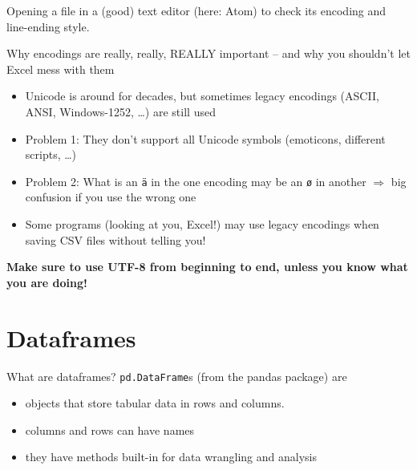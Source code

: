 \documentclass[compress]{beamer}
\begin{document}
\begin{frame}[plain]

Opening a file in a (good) text editor (here: Atom) to check its encoding and line-ending style.
\end{frame}


\begin{frame}{Why encodings are really, really, REALLY important -- and why you shouldn't let Excel mess with them}
\begin{itemize}
	\item Unicode is around for decades, but sometimes legacy encodings (ASCII, ANSI, Windows-1252, \ldots) are still used
	\item Problem 1: They don't support all Unicode symbols (emoticons, different scripts, \ldots)
	\item Problem 2: What is an \texttt{\"a} in the one encoding may be an \texttt{\o}  in another $\Rightarrow$ big confusion if you use the wrong one
	\item Some programs (looking at you, Excel!) may use legacy encodings when saving CSV files without telling you!
\end{itemize}
\textbf{Make sure to use UTF-8 from beginning to end, unless you know what you are doing!}

\end{frame}



\section{Dataframes}


\begin{frame}{What are dataframes?}
\texttt{pd.DataFrame}s (from the pandas package) are
	\begin{itemize}
		\item objects that store tabular data in rows and columns.
		\item columns and rows can have names
		\item they have methods built-in for data wrangling and analysis
	\end{itemize}

\end{frame}
\end{document}
